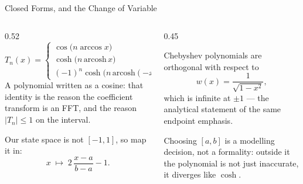 \begin{frame}{Closed Forms, and the Change of Variable}
\begin{columns}[T]
\begin{column}{0.52\textwidth}
\small
\[
T_n(x)=\begin{cases}
\cos\big(n\arccos x\big) & -1\le x\le 1\\
\cosh\big(n\,\mathrm{arcosh}\,x\big) & x\ge 1\\
(-1)^{n}\cosh\big(n\,\mathrm{arcosh}(-x)\big) & x\le -1
\end{cases}
\]
\medskip
A polynomial written as a cosine: that identity is the reason the coefficient transform is an FFT, and the reason $|T_n|\le1$ on the interval.
\medskip

Our state space is not $[-1,1]$, so map it in:
\[
  x \;\longmapsto\; 2\,\frac{x-a}{b-a}-1 .
\]
\end{column}
\begin{column}{0.45\textwidth}
\begin{conceptbox}[title=\textbf{The weight}]\small
Chebyshev polynomials are orthogonal with respect to
\[
  w(x)=\frac{1}{\sqrt{1-x^{2}}} ,
\]
which is infinite at $\pm1$ --- the analytical statement of the same endpoint emphasis.
\end{conceptbox}
\medskip
\begin{cautionbox}\footnotesize
Choosing $[a,b]$ is a modelling decision, not a formality: outside it the polynomial is not just inaccurate, it diverges like $\cosh$.
\end{cautionbox}
\end{column}
\end{columns}
\vspace{1mm}
\end{frame}

